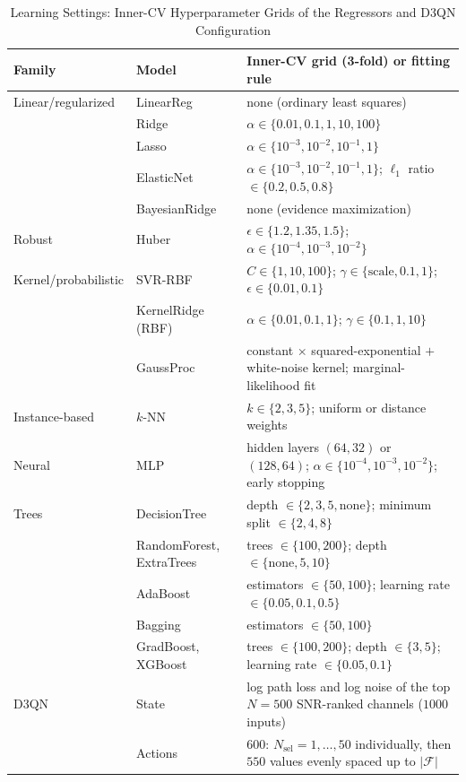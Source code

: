 \documentclass{ieee-ojvt}
\begin{document}
\begin{table}[!t]
\caption{Learning Settings: Inner-CV Hyperparameter Grids of the Regressors and D3QN
Configuration}
\label{tab:mlparams}
\setlength{\tabcolsep}{3pt}
\renewcommand{\arraystretch}{1.12}
\begin{tabular*}{\textwidth}{@{\extracolsep{\fill}}l l l@{}}
\hline
Family & Model & Inner-CV grid (3-fold) or fitting rule\\
\hline
Linear/regularized & LinearReg & none (ordinary least squares)\\
 & Ridge & $\alpha\in\{0.01,0.1,1,10,100\}$\\
 & Lasso & $\alpha\in\{10^{-3},10^{-2},10^{-1},1\}$\\
 & ElasticNet & $\alpha\in\{10^{-3},10^{-2},10^{-1},1\}$; $\ell_1$ ratio $\in\{0.2,0.5,0.8\}$\\
 & BayesianRidge & none (evidence maximization)\\
Robust & Huber & $\epsilon\in\{1.2,1.35,1.5\}$; $\alpha\in\{10^{-4},10^{-3},10^{-2}\}$\\
Kernel/probabilistic & SVR-RBF & $C\in\{1,10,100\}$; $\gamma\in\{\text{scale},0.1,1\}$; $\epsilon\in\{0.01,0.1\}$\\
 & KernelRidge (RBF) & $\alpha\in\{0.01,0.1,1\}$; $\gamma\in\{0.1,1,10\}$\\
 & GaussProc & constant $\times$ squared-exponential $+$ white-noise kernel; marginal-likelihood fit\\
Instance-based & $k$-NN & $k\in\{2,3,5\}$; uniform or distance weights\\
Neural & MLP & hidden layers $(64,32)$ or $(128,64)$; $\alpha\in\{10^{-4},10^{-3},10^{-2}\}$; early stopping\\
Trees & DecisionTree & depth $\in\{2,3,5,\text{none}\}$; minimum split $\in\{2,4,8\}$\\
 & RandomForest, ExtraTrees & trees $\in\{100,200\}$; depth $\in\{\text{none},5,10\}$\\
 & AdaBoost & estimators $\in\{50,100\}$; learning rate $\in\{0.05,0.1,0.5\}$\\
 & Bagging & estimators $\in\{50,100\}$\\
 & GradBoost, XGBoost & trees $\in\{100,200\}$; depth $\in\{3,5\}$; learning rate $\in\{0.05,0.1\}$\\
\hline
D3QN & State & log path loss and log noise of the top $N=500$ SNR-ranked channels ($1000$ inputs)\\
 & Actions & $600$: $N_{\text{sel}}=1,\dots,50$ individually, then $550$ values evenly spaced up to $|\mathcal{F}|$\\

\end{tabular*}
\end{table}
\end{document}
